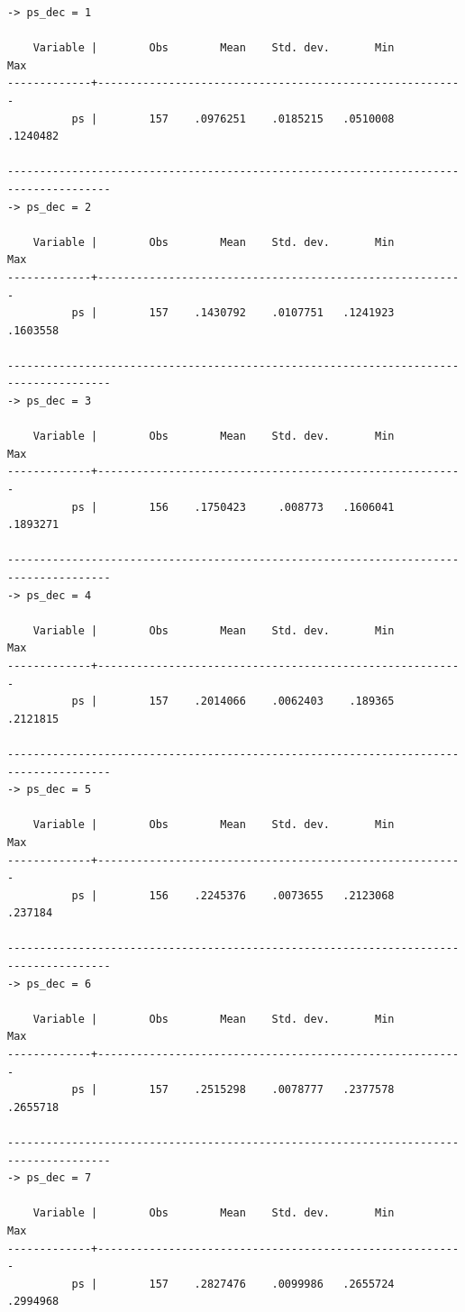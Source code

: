 \documentclass[
  10pt,
  a4paper,
]{book}
\begin{document}
\begin{verbatim}
-> ps_dec = 1

    Variable |        Obs        Mean    Std. dev.       Min        Max
-------------+---------------------------------------------------------
          ps |        157    .0976251    .0185215   .0510008   .1240482

--------------------------------------------------------------------------------------
-> ps_dec = 2

    Variable |        Obs        Mean    Std. dev.       Min        Max
-------------+---------------------------------------------------------
          ps |        157    .1430792    .0107751   .1241923   .1603558

--------------------------------------------------------------------------------------
-> ps_dec = 3

    Variable |        Obs        Mean    Std. dev.       Min        Max
-------------+---------------------------------------------------------
          ps |        156    .1750423     .008773   .1606041   .1893271

--------------------------------------------------------------------------------------
-> ps_dec = 4

    Variable |        Obs        Mean    Std. dev.       Min        Max
-------------+---------------------------------------------------------
          ps |        157    .2014066    .0062403    .189365   .2121815

--------------------------------------------------------------------------------------
-> ps_dec = 5

    Variable |        Obs        Mean    Std. dev.       Min        Max
-------------+---------------------------------------------------------
          ps |        156    .2245376    .0073655   .2123068    .237184

--------------------------------------------------------------------------------------
-> ps_dec = 6

    Variable |        Obs        Mean    Std. dev.       Min        Max
-------------+---------------------------------------------------------
          ps |        157    .2515298    .0078777   .2377578   .2655718

--------------------------------------------------------------------------------------
-> ps_dec = 7

    Variable |        Obs        Mean    Std. dev.       Min        Max
-------------+---------------------------------------------------------
          ps |        157    .2827476    .0099986   .2655724   .2994968


\end{verbatim}
\end{document}
